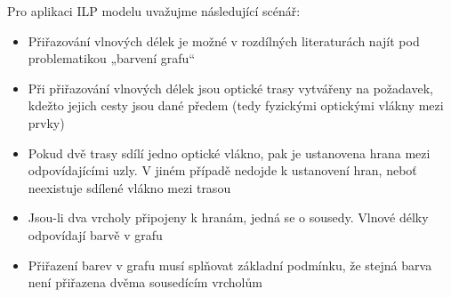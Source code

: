 Pro aplikaci ILP modelu uvažujme následující scénář:
\begin{itemize}
    \item Přiřazování vlnových délek je možné v rozdílných literaturách najít pod problematikou „barvení grafu“
    \item Při přiřazování vlnových délek jsou optické trasy vytvářeny na požadavek, kdežto jejich cesty jsou dané předem (tedy fyzickými optickými vlákny mezi prvky)
    \item Pokud dvě trasy sdílí jedno optické vlákno, pak je ustanovena hrana mezi odpovídajícími uzly. V jiném případě nedojde k ustanovení hran, neboť neexistuje sdílené vlákno mezi trasou
    \item Jsou-li dva vrcholy připojeny k hranám, jedná se o sousedy. Vlnové délky odpovídají barvě v grafu
    \item Přiřazení barev v grafu musí splňovat základní podmínku, že stejná barva není přiřazena dvěma sousedícím vrcholům
\end{itemize}
